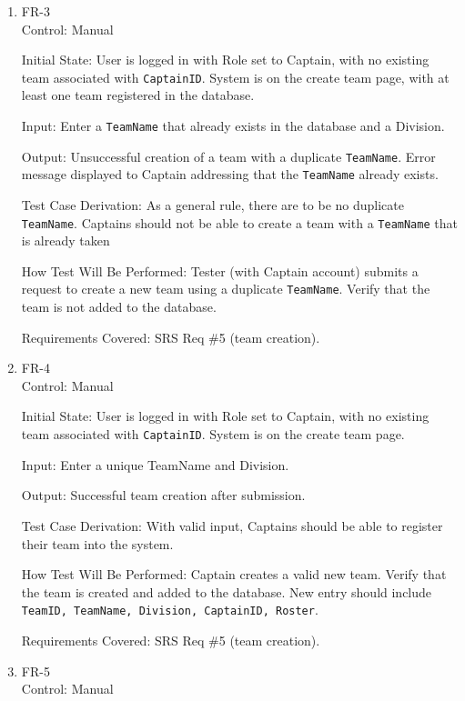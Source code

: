 \documentclass[12pt, titlepage]{article}
\begin{document}
\begin{enumerate}

    \item{FR-3\\}
          Control: Manual

          Initial State: User is logged in with Role set to Captain, with no existing team associated with \texttt{CaptainID}. System is on the create team page, with at least one team registered in the database.

          Input: Enter a \texttt{TeamName} that already exists in the database and a Division.

          Output: Unsuccessful creation of a team with a duplicate \texttt{TeamName}. Error message displayed to Captain addressing that the \texttt{TeamName} already exists.

          Test Case Derivation: As a general rule, there are to be no duplicate \texttt{TeamName}. Captains should not be able to create a team with a \texttt{TeamName} that is already taken

          How Test Will Be Performed: Tester (with Captain account) submits a request to create a new team using a duplicate \texttt{TeamName}. Verify that the team is not added to the database.

          Requirements Covered: SRS Req \#5 (team creation).

    \item{FR-4\\}
          Control: Manual

          Initial State: User is logged in with Role set to Captain, with no existing team associated with \texttt{CaptainID}. System is on the create team page.

          Input: Enter a unique TeamName and Division.

          Output: Successful team creation after submission.

          Test Case Derivation: With valid input, Captains should be able to register their team into the system.

          How Test Will Be Performed: Captain creates a valid new team. Verify that the team is created and added to the database. New entry should include \texttt{TeamID, TeamName, Division, CaptainID, Roster}.

          Requirements Covered: SRS Req \#5 (team creation).

    \item{FR-5\\}
          Control: Manual


\end{enumerate}
\end{document}
